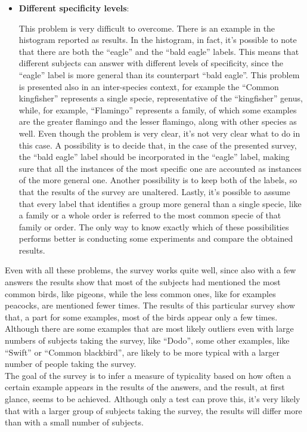 \documentclass[conference]{IEEEtran}
\begin{document}
\begin{itemize}
			\item \textbf{Different specificity levels}:
			
				This problem is very difficult to overcome. There is an example in the histogram reported as results. In the histogram, in fact, it's possible to note that there are both the ``eagle'' and 
				the ``bald eagle'' labels. This means that different subjects can answer with different levels of specificity, since the ``eagle'' label is more general than its counterpart ``bald eagle''. 
				This problem is presented also in an inter-species context, for example the ``Common kingfisher'' represents a single specie, representative of the ``kingfisher'' genus, while, for example, 
				``Flamingo'' represents a family, of which some examples are the greater flamingo and the lesser flamingo, along with other species as well. 
				Even though the problem is very clear, it's not very clear what to do in this case. A possibility is to decide that, in the case of the presented survey, 
				the ``bald eagle'' label should be incorporated in the ``eagle'' 
				label, making sure that all the instances of the most specific one are accounted as instances of the more general one. Another possibility is to keep both of the labels, so that the results of 
				the survey are unaltered. Lastly, it's possible to assume that every label that identifies a group more general than a single specie, like a family or a whole order is referred to the most 
				common specie of that family or order. The only way to know exactly which of these possibilities performs better is conducting some experiments and compare the obtained results.
		
		\end{itemize}
		
		\noindent Even with all these problems, the survey works quite well, since also with a few answers the results show that most of the subjects had mentioned the most common birds, like pigeons, while the 
		less common ones, like for examples peacocks, are mentioned fewer times. The results of this particular survey show that, a part for some examples, most of the birds appear only a few times. Although there 
		are some examples that are most likely outliers even with large numbers of subjects taking the survey, like ``Dodo'', some other examples, like ``Swift'' or ``Common blackbird'', 
		are likely to be more typical with a larger number of people taking the survey.\\
		The goal of the survey is to infer a measure of typicality based on how often a certain example appears in the results of the answers, and the result, at first glance, seems to be achieved. Although only 
		a test can prove this, it's very likely that with a larger group of subjects taking the survey, the results will differ more than with a small number of subjects.
		
\end{document}
